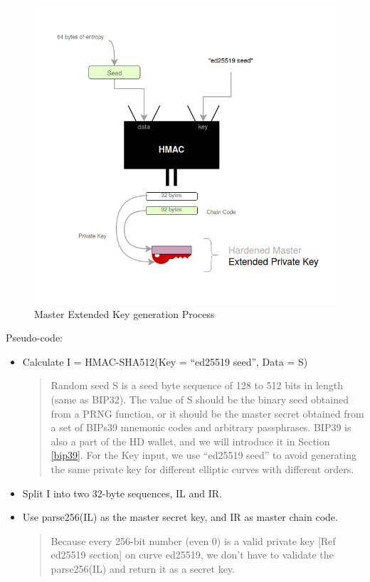 \bigskip
\begin{figure}[ht!]
    \centering
    \includegraphics[width=1\textwidth]{images/master_slip10.png}
    \caption[Master Extended Key generation Process]{Master Extended Key generation Process}
    \label{fig:5}
\end{figure}

Pseudo-code:

\begin{itemize}
    \item Calculate I = HMAC-SHA512(Key = “ed25519 seed”, Data = S)

          \begin{quote}
              Random seed S is a seed byte sequence of 128 to 512 bits in length (same as BIP32). The value of S should be the binary seed obtained from a PRNG function, or it should be the master secret obtained from a set of BIPs39 mnemonic codes and arbitrary passphrases. BIP39 is also a part of the HD wallet, and we will introduce it in Section \ref{bip39}. For the Key input, we use “ed25519 seed” to avoid generating the same private key for different elliptic curves with different orders.
          \end{quote}

          \bigskip

    \item Split I into two 32-byte sequences, IL and IR.
          \bigskip

    \item Use parse256(IL) as the master secret key, and IR as master chain code.

          \begin{quote}
              Because every 256-bit number (even 0) is a valid private key [Ref ed25519 section] on curve ed25519, we don’t have to validate the parse256(IL) and return it as a secret key.
          \end{quote}
\end{itemize}

